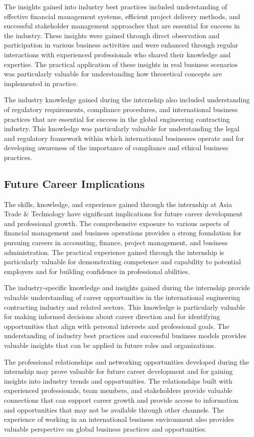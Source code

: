 The insights gained into industry best practices included understanding of effective financial management systems, efficient project delivery methods, and successful stakeholder management approaches that are essential for success in the industry. These insights were gained through direct observation and participation in various business activities and were enhanced through regular interactions with experienced professionals who shared their knowledge and expertise. The practical application of these insights in real business scenarios was particularly valuable for understanding how theoretical concepts are implemented in practice.

The industry knowledge gained during the internship also included understanding of regulatory requirements, compliance procedures, and international business practices that are essential for success in the global engineering contracting industry. This knowledge was particularly valuable for understanding the legal and regulatory framework within which international businesses operate and for developing awareness of the importance of compliance and ethical business practices.

\subsection{Future Career Implications}
The skills, knowledge, and experience gained through the internship at Asia Trade \& Technology have significant implications for future career development and professional growth. The comprehensive exposure to various aspects of financial management and business operations provides a strong foundation for pursuing careers in accounting, finance, project management, and business administration. The practical experience gained through the internship is particularly valuable for demonstrating competence and capability to potential employers and for building confidence in professional abilities.

The industry-specific knowledge and insights gained during the internship provide valuable understanding of career opportunities in the international engineering contracting industry and related sectors. This knowledge is particularly valuable for making informed decisions about career direction and for identifying opportunities that align with personal interests and professional goals. The understanding of industry best practices and successful business models provides valuable insights that can be applied in future roles and organizations.

The professional relationships and networking opportunities developed during the internship may prove valuable for future career development and for gaining insights into industry trends and opportunities. The relationships built with experienced professionals, team members, and stakeholders provide valuable connections that can support career growth and provide access to information and opportunities that may not be available through other channels. The experience of working in an international business environment also provides valuable perspective on global business practices and opportunities.
